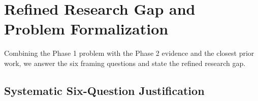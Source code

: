 \documentclass[11pt,a4paper]{article}
\begin{document}
\section{Refined Research Gap and Problem Formalization}
\label{sec:refined_gap}

Combining the Phase 1 problem with the Phase 2 evidence and the closest prior work, we answer the six framing questions and state the refined research gap.

\subsection{Systematic Six-Question Justification}
\end{document}
